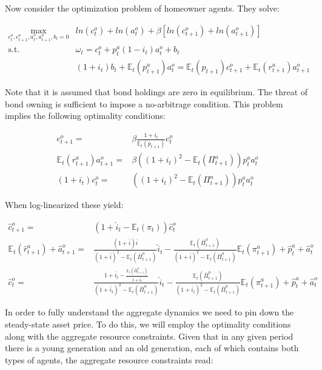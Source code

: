 \documentclass{article}
\begin{document}
Now consider the optimization problem of homeowner agents. They solve:

\begin{align}
    \underset{c^o_t, c^o_{t+1}, a^o_{t}, a^o_{t+1}, b_t=0}{\max} &ln(c^o_t) + ln(a^o_t) + \beta[ln(c^o_{t+1}) + ln(a^o_{t+1})] \nonumber \\
    \text{s.t. }& \omega_t = c^o_t + p^a_t (1 - i_t) a^o_t + b_t \nonumber \\
    & (1 + i_t) b_t + \mathbb{E}_t (p^a_{t+1}) a^o_t = \mathbb{E}_t(p_{t+1})c^o_{t+1} + \mathbb{E}_t(r^a_{t+1})a^o_{t+1}
\end{align}

Note that it is assumed that bond holdings are zero in equilibrium. The threat of bond owning is sufficient to impose a no-arbitrage condition. This problem implies the following optimality conditions:

\begin{align}
    c^o_{t+1} =& \beta \frac{1 + i_t}{\mathbb{E}_t (p_{t+1})} c^o_t \\
    \mathbb{E}_t(r^a_{t+1}) a^o_{t+1} =& \beta \left( (1+i_t)^2 - \mathbb{E}_t (\Pi^a_{t+1}) \right) p^a_t a^o_t \\
    (1 + i_t) c^o_t =& \left( (1+i_t)^2 - \mathbb{E}_t (\Pi^a_{t+1}) \right) p^a_t a^o_t
\end{align}

When log-linearized these yield:

\begin{align}
    \hat{c}^o_{t+1} =& (1 + \hat{i}_t - \mathbb{E}_t(\pi_t))\hat{c}^o_t \\
    \mathbb{E}_t(\hat{r}^a_{t+1}) + \hat{a}^o_{t+1} =& \frac{(1+\bar{i})\bar{i}}{(1+\bar{i})^2 - \mathbb{E}_t(\bar{\Pi}^a_{t+1})}\hat{i}_t - \frac{\mathbb{E}_t(\bar{\Pi}^a_{t+1})}{(1+\bar{i})^2 - \mathbb{E}_t(\bar{\Pi}^a_{t+1})} \mathbb{E}_t(\pi^a_{t+1}) + \hat{p}^a_t + \hat{a}^o_t \\
    \hat{c}^o_t =& \frac{1+\bar{i}_t - \frac{\mathbb{E}_t(\bar{\Pi}^a_{t+1})}{1+\bar{i}_t}}{(1+\bar{i}_t)^2 - \mathbb{E}_t(\bar{\Pi}^a_{t+1})}\hat{i}_t - \frac{\mathbb{E}_t(\bar{\Pi}^a_{t+1})}{(1+\bar{i}_t)^2 - \mathbb{E}_t(\bar{\Pi}^a_{t+1})}\mathbb{E}_t(\pi^a_{t+1}) + \hat{p}^a_t + \hat{a}^o_t
\end{align}

In order to fully understand the aggregate dynamics we need to pin down the steady-state asset price. To do this, we will employ the optimality conditions along with the aggregate resource constraints. Given that in any given period there is a young generation and an old generation, each of which contains both types of agents, the aggregate resource constraints read:
\end{document}
